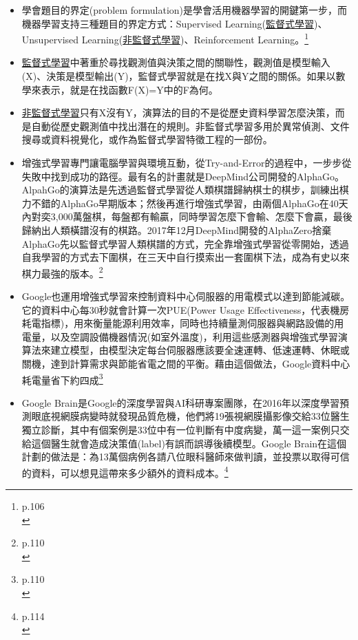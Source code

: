 \documentclass[a4paper,12pt]{article}
\begin{document}
\begin{itemize}
\item 學會題目的界定(problem formulation)是學會活用機器學習的開鍵第一步，而機器學習支持三種題目的界定方式：Supervised Learning(\href{20221023101626-監督式學習.org}{監督式學習})、Unsupervised Learning(\href{20221023101716-非監督式學習.org}{非監督式學習})、Reinforcement Learning。\footnote{p.106\\}\\
\item \href{20221023101626-監督式學習.org}{監督式學習}中著重於尋找觀測值與決策之間的關聯性，觀測值是模型輸入(X)、決策是模型輸出(Y)，監督式學習就是在找X與Y之間的關係。如果以數學來表示，就是在找函數F(X)=Y中的F為何。\\
\item \href{20221023101716-非監督式學習.org}{非監督式學習}只有X沒有Y，演算法的目的不是從歷史資料學習怎麼決策，而是自動從歷史觀測值中找出潛在的規則。非監督式學習多用於異常偵測、文件搜尋或資料視覺化，或作為監督式學習特徵工程的一部份。\\
\item 增強式學習專門讓電腦學習與環境互動，從Try-and-Error的過程中，一步步從失敗中找到成功的路徑。最有名的計畫就是DeepMind公司開發的AlphaGo。AlpahGo的演算法是先透過監督式學習從人類棋譜歸納棋士的棋步，訓練出棋力不錯的AlphaGo早期版本；然後再進行增強式學習，由兩個AlphaGo在40天內對奕3,000萬盤棋，每盤都有輸贏，同時學習怎麼下會輸、怎麼下會贏，最後歸納出人類橫譜沒有的棋路。2017年12月DeepMind開發的AlphaZero捨棄AlphaGo先以監督式學習人類棋譜的方式，完全靠增強式學習從零開始，透過自我學習的方式去下圍棋，在三天中自行摸索出一套圍棋下法，成為有史以來棋力最強的版本。\footnote{p.110\\}\\
\item Google也運用增強式學習來控制資料中心伺服器的用電模式以達到節能減碳。它的資料中心每30秒就會計算一次PUE(Power Usage Effectiveness，代表機房耗電指標)，用來衡量能源利用效率，同時也持續量測伺服器與網路設備的用電量，以及空調設備機器情況(如室外溫度)，利用這些感測器與增強式學習演算法來建立模型，由模型決定每台伺服器應該要全速運轉、低速運轉、休眠或關機，達到計算需求與節能省電之間的平衡。藉由這個做法，Google資料中心耗電量省下約四成\footnote{p.110\\}\\
\item Google Brain是Google的深度學習與AI科研專案團隊，在2016年以深度學習預測眼底視網膜病變時就發現品質危機，他們將19張視網膜攝影像交給33位醫生獨立診斷，其中有個案例是33位中有一位判斷有中度病變，萬一這一案例只交給這個醫生就會造成決策值(label)有誤而誤導後續模型。Google Brain在這個計劃的做法是：為13萬個病例各請八位眼科醫師來做判讀，並投票以取得可信的資料，可以想見這帶來多少額外的資料成本。\footnote{p.114\\}\\
\end{itemize}
\end{document}
